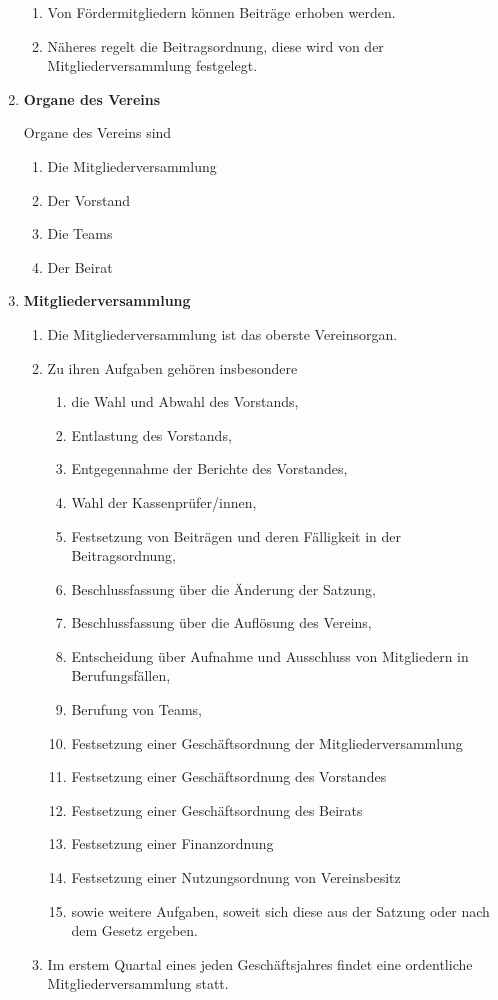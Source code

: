 \documentclass[german]{article}
\newcommand{\paragr}[1]{\item \textsf{\textbf{#1}}}
\begin{document}
\begin{enumerate}
\begin{enumerate}
			\item Von Fördermitgliedern können Beiträge erhoben werden.
			
			\item Näheres regelt die Beitragsordnung, diese wird von der Mitgliederversammlung festgelegt.
			
		\end{enumerate}
		
		
		\paragr{Organe des Vereins}
		
		Organe des Vereins sind
		\begin{enumerate}
			\item Die Mitgliederversammlung
			\item Der Vorstand
			\item Die Teams
			\item Der Beirat
		\end{enumerate}
		
		
		\paragr{Mitgliederversammlung}
		\begin{enumerate}
			
			\item Die Mitgliederversammlung ist das oberste Vereinsorgan.
			
			\item Zu ihren Aufgaben gehören insbesondere
			\begin{enumerate}
				\item die Wahl und Abwahl des Vorstands,
				\item Entlastung des Vorstands,
				\item Entgegennahme der Berichte des Vorstandes,
				\item Wahl der Kassenprüfer/innen,
				\item Festsetzung von Beiträgen und deren Fälligkeit in der Beitragsordnung,
				\item Beschlussfassung über die Änderung der Satzung,
				\item Beschlussfassung über die Auflösung des Vereins,
				\item Entscheidung über Aufnahme und Ausschluss von Mitgliedern in Berufungsfällen,
				\item Berufung von Teams,
				\item Festsetzung einer Geschäftsordnung der Mitgliederversammlung
				\item Festsetzung einer Geschäftsordnung des Vorstandes
				\item Festsetzung einer Geschäftsordnung des Beirats
				\item Festsetzung einer Finanzordnung
				\item Festsetzung einer Nutzungsordnung von Vereinsbesitz
				\item sowie weitere Aufgaben, soweit sich diese aus der Satzung oder nach dem Gesetz ergeben.
			\end{enumerate}
			\item Im erstem Quartal eines jeden Geschäftsjahres findet eine ordentliche Mitgliederversammlung statt.
			

\end{enumerate}
\end{enumerate}
\end{document}
